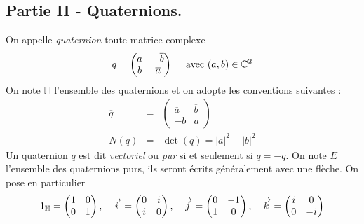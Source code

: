 \subsection*{Partie II - Quaternions.}
On appelle \emph{quaternion} toute matrice complexe
\[q=\begin{pmatrix}
 a & -\overline{b}  \\ 
 b & \overline{a}
\end{pmatrix} \quad \text{ avec } (a,b)\in\mathbb{C} ^2\]
On note $\mathbb{H}$ l'ensemble des quaternions et on adopte les conventions suivantes :
\begin{eqnarray*}
\overline{q} &=& \begin{pmatrix}
 \overline{a} & \overline{b}  \\ 
 -b & a
\end{pmatrix}\\
N(q) &=& \det(q)=|a|^2+|b|^2
\end{eqnarray*}
Un quaternion $q$ est dit \emph{vectoriel} ou \emph{pur} si et seulement si $\overline{q}=-q$.\newline
On note $E$ l'ensemble des quaternions purs, ils seront écrits généralement avec une flèche. On pose en particulier
\[1_{\mathbb{H}}=\begin{pmatrix}
 1 & 0  \\ 
 0 & 1
\end{pmatrix},\hspace{0.3cm}
\overrightarrow{i}=\begin{pmatrix}
 0 & i  \\ 
 i & 0
\end{pmatrix},\hspace{0.3cm}
\overrightarrow{j}=\begin{pmatrix}
 0 & -1  \\ 
 1 & 0
\end{pmatrix},\hspace{0.3cm}
\overrightarrow{k}=\begin{pmatrix}
 i & 0  \\ 
 0 & -i
\end{pmatrix}\]
